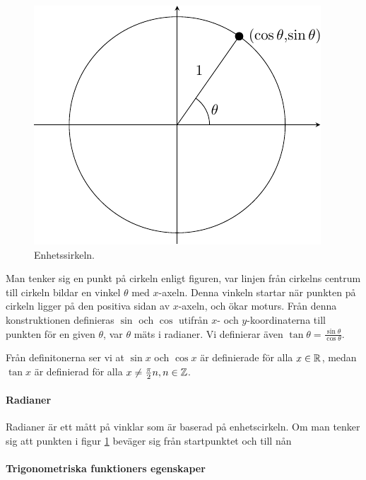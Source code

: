\begin{figure}[!ht]
	\includegraphics[width=\linewidth]{./Images/unit_circle/unit_circle.pdf}
	\caption{Enhetssirkeln.}
	\label{fig:unit_circle}
\end{figure}

Man tenker sig en punkt på cirkeln enligt figuren, var linjen från cirkelns centrum till cirkeln bildar en vinkel $\theta$ med $x$-axeln. Denna vinkeln startar när punkten på cirkeln ligger på den positiva sidan av $x$-axeln, och ökar moturs. Från denna konstruktionen definieras $\sin$ och $\cos$ utifrån $x$- och $y$-koordinaterna till punkten för en given $\theta$, var $\theta$ mäts i radianer. Vi definierar även $\tan\theta=\frac{\sin\theta}{\cos\theta}$.

Från definitonerna ser vi at $\sin x$ och $\cos x$ är definierade för alla $x\in\mathbb{R}$, medan $\tan x$ är definierad för alla $x\neq \frac{\pi}{2}n, n\in\mathbb{Z}$.

\paragraph{Radianer}

Radianer är ett mått på vinklar som är baserad på enhetscirkeln. Om man tenker sig att punkten i figur \ref{fig:unit_circle} beväger sig från startpunktet och till nån 

\paragraph{Trigonometriska funktioners egenskaper}

